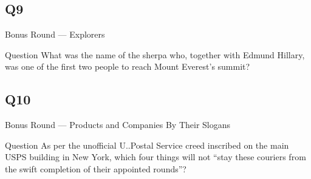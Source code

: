 \documentclass[11pt]{beamer}
\begin{document}
\subsection*{Q9}
\begin{frame}[t]{Bonus Round --- Explorers}
\begin{block}{Question}
What was the name of the sherpa who, together with Edmund Hillary, was one of the first two people to reach Mount Everest's summit?
\end{block}
\end{frame}
\subsection*{Q10}
\begin{frame}[t]{Bonus Round --- Products and Companies By Their Slogans}
\begin{block}{Question}
As per the unofficial U.\@S.\@ Postal Service creed inscribed on the main USPS building in New York, which four things will not ``stay these couriers from the swift completion of their appointed rounds''?
\end{block}
\end{frame}
\end{document}
